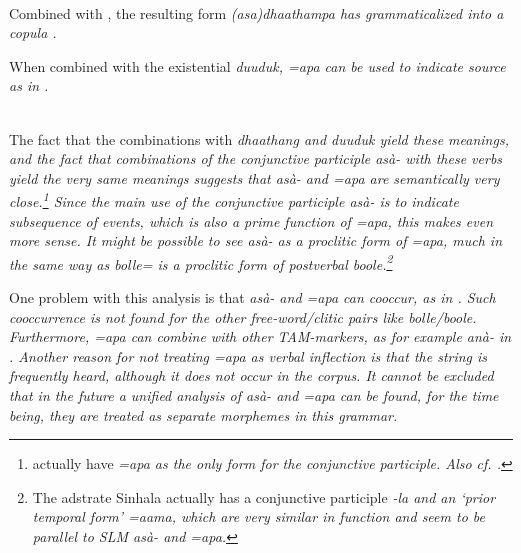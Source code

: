  \\
Combined with , the resulting form \em (asa)dhaathampa \em has grammaticalized into a copula .

When combined with  the existential \em duuduk\em, \em =apa \em can be used to indicate source as in .

\\ 
 
The fact that the combinations with \em dhaathang \em and \em duuduk \em yield these meanings, and the fact that combinations of the conjunctive participle \em asà- \em with these verbs yield the very same meanings  suggests that \em asà- \em and \em =apa \em are semantically very close.\footnote{\citet{SmithEtAl2004} actually have \em =apa \em as the only form for the conjunctive participle. Also cf. \citet[143]{Bakker2006}.} Since the main use of the conjunctive participle \em asà- \em is to indicate subsequence of events, which is also a prime function of \em =apa\em, this makes even more sense. It might be possible to see \em asà- \em as a proclitic form of \em =apa\em, much in the same way as \em bolle= \em is a proclitic form of postverbal \em boole\em.\footnote{The adstrate Sinhala actually has a conjunctive participle \em -la \em and an `prior temporal form' \em =aama\em  \citet[811]{Gair2003}, which are very similar in function and seem to be parallel to SLM \em asà- \em and \em =apa\em.}

One problem with this analysis is that \em asà- \em and \em =apa \em can cooccur, as in . Such cooccurrence is not found for the other free-word/clitic pairs like \em bolle/boole\em. Furthermore, \em =apa \em can combine with other TAM-markers, as for example \em anà- \em in .  Another reason for not treating \em =apa \em as verbal inflection is that the string  is frequently heard, although it does not occur in the corpus. It cannot be excluded that in the future a unified analysis of \em asà- \em and \em =apa \em can be found, for the time being, they are treated as separate morphemes in this grammar.

